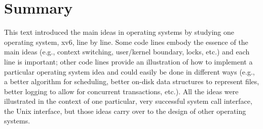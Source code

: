 \chapter{Summary}
\label{CH:SUM}

This text introduced the main ideas in operating systems by studying one
operating system, xv6, line by line.  Some code lines embody the essence of the
main ideas (e.g., context switching, user/kernel boundary, locks, etc.) and each
line is important; other code lines provide an illustration of how to implement
a particular operating system idea and could easily be done in different ways
(e.g., a better algorithm for scheduling, better on-disk data structures to
represent files, better logging to allow for concurrent transactions, etc.).
All the ideas were illustrated in the context of one particular, very successful
system call interface, the Unix interface, but those ideas carry over to the
design of other operating systems.

